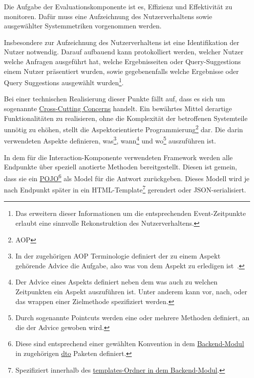 Die Aufgabe der Evaluationskomponente ist es, Effizienz und Effektivität zu monitoren.
Dafür muss eine Aufzeichnung des Nutzerverhaltens sowie ausgewählter Systemmetriken vorgenommen werden.

Insbesondere zur Aufzeichnung des Nutzerverhaltens ist eine Identifikation der Nutzer notwendig.
Darauf aufbauend kann protokolliert werden, welcher Nutzer welche Anfragen ausgeführt
hat, welche Ergebnisseiten oder Query-Suggestions einem Nutzer präsentiert wurden,
sowie gegebenenfalls welche Ergebnisse oder Query Suggestions ausgewählt
wurden\footnote{Das erweitern dieser Informationen um die entsprechenden Event-Zeitpunkte erlaubt eine
sinnvolle Rekonstruktion des Nutzerverhaltens.}.

Bei einer technischen Realisierung dieser Punkte fällt auf,
dass es sich um sogenannte \href{https://de.wikipedia.org/wiki/Cross-Cutting_Concern}{Cross-Cutting Concerns}
handelt. Ein bewährtes Mittel derartige Funktionalitäten zu realisieren, ohne die
Komplexität der betroffenen Systemteile unnötig zu ehöhen,
stellt die Aspektorientierte Programmierung\footnote{AOP} dar\cite{spring.chap1.1}.
Die darin verwendeten Aspekte definieren,
was\footnote{In der zugehörigen AOP Terminologie definiert der zu einem Aspekt gehörende Advice die Aufgabe,
also was von dem Aspekt zu erledigen ist~\cite{spring.chap4.1}.}, wann\footnote{Der Advice eines Aspekts definiert 
neben dem was auch zu welchen Zeitpunkten ein Aspekt auszuführen ist.
Unter anderem kann vor, nach, oder das wrappen einer Zielmethode spezifiziert werden\cite{spring.chap4.1}.}
und wo\footnote{Durch sogenannte Pointcuts werden eine oder mehrere Methoden definiert,
an die der Advice gewoben wird\cite{spring.chap4.1}.} auszuführen ist\cite{spring.chap4.1}.

In dem für die Interaction-Komponente verwendeten Framework werden alle Endpunkte über speziell anotierte Methoden
bereitgestellt.
Diesen ist gemein, dass sie ein
\href{https://de.wikipedia.org/wiki/Plain_Old_Java_Object}{POJO}\footnote{Diese sind 
entsprechend einer gewählten Konvention in dem 
\href{https://github.com/mam10eks/search-homepage-of-university-leipzig/tree/master/search-engine-backend}{Backend-Modul}
in zugehörigen \href{https://de.wikipedia.org/wiki/Transferobjekt}{dto} Paketen definiert.}
als Model für die Antwort zurückgeben. 
Dieses Modell wird je nach Endpunkt später in ein HTML-Template\footnote{Spezifiziert innerhalb des 
\href{https://github.com/mam10eks/search-homepage-of-university-leipzig/tree/master/search-engine-backend/src/main/resources/templates}
{templates-Ordner in dem Backend-Modul}.} gerendert oder
JSON-serialisiert.

